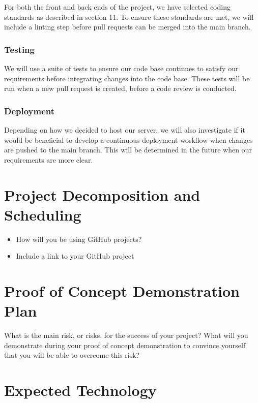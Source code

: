\documentclass{article}
\begin{document}
 For both the front and back ends of the project, we have selected coding standards as described in section 11. To ensure these standards are met, we will include
 a linting step before pull requests can be merged into the main branch.

\subsubsection{Testing}
We will use a suite of tests to ensure our code base continues to satisfy our requirements before integrating changes into the code base. These tests
will be run when a new pull request is created, before a code review is conducted.

\subsubsection{Deployment}
Depending on how we decided to host our server, we will also investigate if it would be beneficial to develop a continuous deployment workflow when changes are 
pushed to the main branch. This will be determined in the future when our requirements are more clear.
\section{Project Decomposition and Scheduling}

\begin{itemize}
  \item How will you be using GitHub projects?
  \item Include a link to your GitHub project
\end{itemize}


\section{Proof of Concept Demonstration Plan}

What is the main risk, or risks, for the success of your project?  What will you
demonstrate during your proof of concept demonstration to convince yourself that
you will be able to overcome this risk?

\section{Expected Technology}
\end{document}
